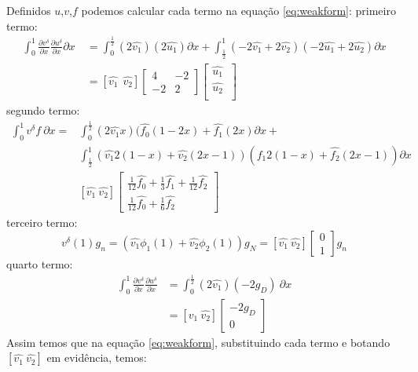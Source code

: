  Definidos $u$,$v$,$f$ podemos calcular cada termo na equação \eqref{eq:weakform}:
 primeiro termo:
\begin{align}
\int^1_0 \frac{\partial v^\delta}{\partial x} \frac{\partial u^\delta}{\partial x} \partial x\ & = \int^{\frac{1}{2}}_0 (2\hat{v_1})(2\hat{u_1}) \partial x + \int^1_{\frac{1}{2}} (-2\hat{v_1}+2\hat{v_2})(-2\hat{u_1}+2\hat{u_2}) \partial x \\
& = [\hat{v_1}\ \ \hat{v_2} ]\begin{bmatrix}
4 & -2 \\ 
-2 & 2
\end{bmatrix}
\begin{bmatrix}
\hat{u_1}\ \\ \hat{u_2}\\ 
\end{bmatrix}
\end{align}
 segundo termo:
\begin{align}
\int^1_0v^\delta f\ \partial x = & \int^{\frac{1}{2}}_0 (2\hat{v_1}x)(\hat{f_0}(1-2x) + \hat{f_1}(2x) \partial x + \\
& \int^1_{\frac{1}{2}} (\hat{v_1}2(1-x) +\hat{v_2}(2x-1))(\hat{f_1}2(1-x) +\hat{f_2}(2x-1)) \partial x \\
& [\hat{v_1}\ \hat{v_2}]\begin{bmatrix}
\frac{1}{12}\hat{f_0} + \frac{1}{3}\hat{f_1} + \frac{1}{12}\hat{f_2} \\ 
\frac{1}{12}\hat{f_0} + \frac{1}{6}\hat{f_2}
\end{bmatrix}
\end{align}
 terceiro termo:
\begin{equation}
v^\delta(1)g_n = (\hat{v_1}\phi_1(1) + \hat{v_2}\phi_2(1))g_N = [\hat{v_1} \ \hat{v_2}]\begin{bmatrix}
0\\ 
1
\end{bmatrix}g_n
\end{equation}
 quarto termo:
 \begin{align}
  \int^1_0 \frac{\partial v^\delta}{\partial x}\frac{\partial u^\delta}{\partial x} &= \int^{\frac{1}{2}}_0 (2\hat{v_1})(-2g_D)\ \partial x \\
             &=  [\hat{v_1}\ \hat{v_2}]\begin{bmatrix}
-2g_D\\ 
0
\end{bmatrix}
 \end{align}
 Assim temos que na equação \eqref{eq:weakform}, substituindo cada termo e botando $[\hat{v_1}\ \hat{v_2}]$ em evidência, temos:
